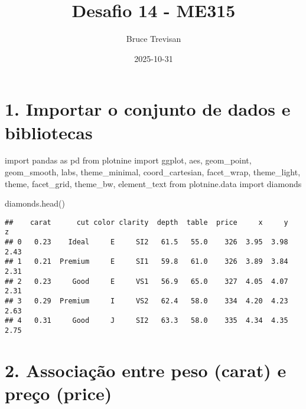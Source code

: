 \documentclass[
]{article}
\title{Desafio 14 - ME315}
\author{Bruce Trevisan}
\date{2025-10-31}
\newenvironment{Shaded}{\begin{snugshade}}{\end{snugshade}}
\newcommand{\ImportTok}[1]{#1}
\newcommand{\NormalTok}[1]{#1}
\begin{document}
\maketitle

\section{1. Importar o conjunto de dados e
bibliotecas}\label{importar-o-conjunto-de-dados-e-bibliotecas}

\begin{Shaded}
\begin{Highlighting}[]
\ImportTok{import}\NormalTok{ pandas }\ImportTok{as}\NormalTok{ pd}
\ImportTok{from}\NormalTok{ plotnine }\ImportTok{import}\NormalTok{ ggplot, aes, geom\_point, geom\_smooth, labs, theme\_minimal, coord\_cartesian, facet\_wrap, theme\_light, theme, facet\_grid, theme\_bw, element\_text}
\ImportTok{from}\NormalTok{ plotnine.data }\ImportTok{import}\NormalTok{ diamonds}
\end{Highlighting}
\end{Shaded}

\begin{Shaded}
\begin{Highlighting}[]
\NormalTok{diamonds.head()}
\end{Highlighting}
\end{Shaded}

\begin{verbatim}
##    carat      cut color clarity  depth  table  price     x     y     z
## 0   0.23    Ideal     E     SI2   61.5   55.0    326  3.95  3.98  2.43
## 1   0.21  Premium     E     SI1   59.8   61.0    326  3.89  3.84  2.31
## 2   0.23     Good     E     VS1   56.9   65.0    327  4.05  4.07  2.31
## 3   0.29  Premium     I     VS2   62.4   58.0    334  4.20  4.23  2.63
## 4   0.31     Good     J     SI2   63.3   58.0    335  4.34  4.35  2.75
\end{verbatim}

\section{2. Associação entre peso (carat) e preço
(price)}\label{associauxe7uxe3o-entre-peso-carat-e-preuxe7o-price}
\end{document}
